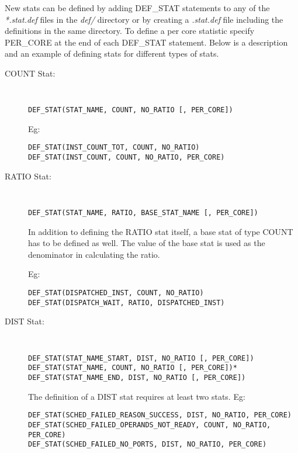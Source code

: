 New stats can be defined by adding DEF\_STAT statements to any of the
\textit{*.stat.def} files in the \textit{def/} directory or by creating a
\textit{.stat.def} file including the definitions in the same
directory.  To define a per core statistic specify PER\_CORE at the
end of each DEF\_STAT statement. Below is a description and an example of 
defining stats for different types of stats.


\begin{description}

\item[COUNT Stat:] \Verb+ +
\par \Verb+DEF_STAT(STAT_NAME, COUNT, NO_RATIO [, PER_CORE])+
\par Eg: 
\begin{Verbatim}
DEF_STAT(INST_COUNT_TOT, COUNT, NO_RATIO)
DEF_STAT(INST_COUNT, COUNT, NO_RATIO, PER_CORE)
\end{Verbatim}

\item[RATIO Stat:] \Verb+ +
\par \Verb+DEF_STAT(STAT_NAME, RATIO, BASE_STAT_NAME [, PER_CORE])+
\par In addition to defining the RATIO stat itself, a base stat of type COUNT has to
be defined as well. The value of the base stat is used as the denominator in
calculating the ratio. 
\par Eg: 
\begin{Verbatim}
DEF_STAT(DISPATCHED_INST, COUNT, NO_RATIO)
DEF_STAT(DISPATCH_WAIT, RATIO, DISPATCHED_INST)
\end{Verbatim}

\item[DIST Stat:] \Verb+ +
\begin{Verbatim}
DEF_STAT(STAT_NAME_START, DIST, NO_RATIO [, PER_CORE])
DEF_STAT(STAT_NAME, COUNT, NO_RATIO [, PER_CORE])*
DEF_STAT(STAT_NAME_END, DIST, NO_RATIO [, PER_CORE])
\end{Verbatim}
\par The definition of a DIST stat requires at least two stats.
Eg: 
\begin{Verbatim}
DEF_STAT(SCHED_FAILED_REASON_SUCCESS, DIST, NO_RATIO, PER_CORE)
DEF_STAT(SCHED_FAILED_OPERANDS_NOT_READY, COUNT, NO_RATIO, PER_CORE)
DEF_STAT(SCHED_FAILED_NO_PORTS, DIST, NO_RATIO, PER_CORE)
\end{Verbatim}

\end{description}


